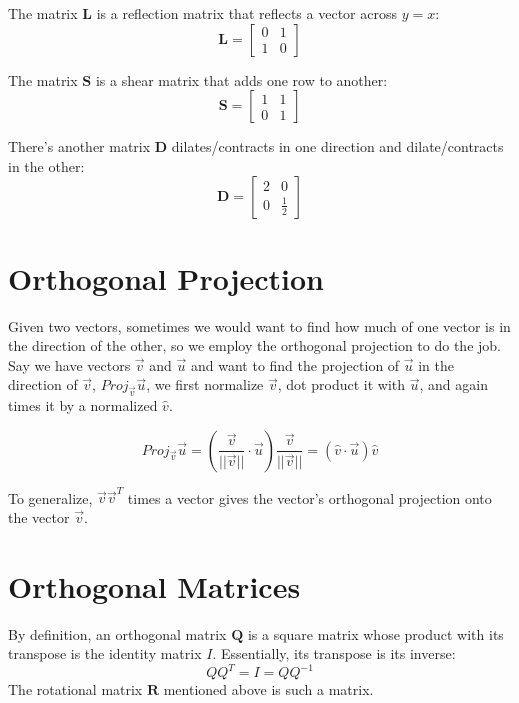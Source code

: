 \documentclass[11pt]{article}
\begin{document}
The matrix $\textbf{L}$ is a reflection matrix that reflects a vector across $y = x$:
\[
\textbf{L}
=
\begin{bmatrix}
    0 & 1\\
    1 & 0
\end{bmatrix}
\]

The matrix $\textbf{S}$ is a shear matrix that adds one row to another:
\[
\textbf{S}
=
\begin{bmatrix}
    1 & 1\\
    0 & 1
\end{bmatrix}
\]

There's another matrix $\textbf{D}$ dilates/contracts in one direction and dilate/contracts in the other:
\[
\textbf{D}
=
\begin{bmatrix}
    2 & 0\\
    0 & \frac{1}{2}
\end{bmatrix}
\]

\section{Orthogonal Projection}
Given two vectors, sometimes we would want to find how much of one vector is in the direction of the other, so we employ the orthogonal projection to do the job. Say we have vectors $\vec{v}$ and $\vec{u}$ and want to find the projection of $\vec{u}$ in the direction of $\vec{v}$, $Proj_\vec{v}\vec{u}$, we first normalize $\vec{v}$, dot product it with $\vec{u}$, and again times it by a normalized $\hat{v}$.

\begin{equation}
    Proj_{\vec{v}}\vec{u}= (\frac{\vec{v}}{||\vec{v}||} \cdot \vec{u})\frac{\vec{v}}{||\vec{v}||} = (\hat{v} \cdot \vec{u})\hat{v}
\end{equation}

To generalize, $\vec{v}\vec{v}^T$ times a vector gives the vector's orthogonal projection onto the vector $\vec{v}$.

\section{Orthogonal Matrices}
By definition, an orthogonal matrix $\textbf{Q}$ is a square matrix whose product with its transpose is the identity matrix $I$. Essentially, its transpose is its inverse:
\begin{equation}
    QQ^{T} = I = QQ^{-1}    
\end{equation}
The rotational matrix $\textbf{R}$ mentioned above is such a matrix.
\end{document}
